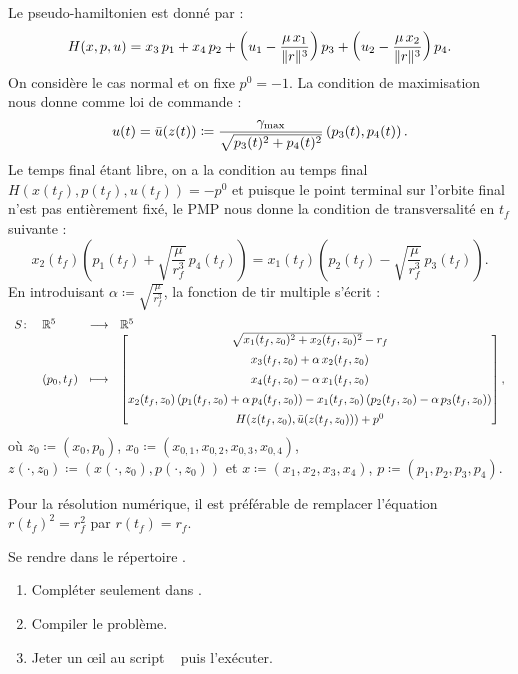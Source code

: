 Le pseudo-hamiltonien est donn\'e par : 
\[
    H(x,p,u) = x_3\, p_1 + x_4\, p_2 + \left(u_1 - \frac{\mu\, x_1}{\lVert r\rVert^3}\right) p_3 + \left(u_2 - \frac{\mu\, x_2}{\lVert r\rVert^3}\right) p_4.
\]
On consid\`ere le cas normal et on fixe $p^0=-1$.
La condition de maximisation nous donne comme loi de commande :
\[
    u(t) = \bar{u}(z(t)) \coloneqq \frac{\gamma_\mathrm{max}}{\sqrt{p_3(t)^2+p_4(t)^2}} \left( p_3(t) , p_4(t) \right).
\]
Le temps final \'etant libre, on a la condition au temps final $H(x(t_f), p(t_f), u(t_f)) = -p^0$ et
puisque le point terminal sur l'orbite final n'est pas enti\`erement fix\'e, le PMP nous donne la condition de transversalit\'e en $t_f$ 
suivante :
\[
    x_2(t_f) \left( p_1(t_f) + \sqrt{\frac{\mu}{r_f^3}}\, p_4(t_f) \right) = x_1(t_f) \left( p_2(t_f) - \sqrt{\frac{\mu}{r_f^3}}\, p_3(t_f) \right).
\]
En introduisant $\alpha \coloneqq \sqrt{\frac{\mu}{r_f^3}}$, la fonction de tir multiple s'\'ecrit :
\begin{equation*}
    \begin{array}{rlll}
        S \colon    & \mathbb{R}^5          & \longrightarrow   & \mathbb{R}^5 \\
        & (p_0, t_f)      & \longmapsto       &
        \begin{bmatrix}
            \sqrt{x_1(t_f, z_0)^2 + x_2(t_f, z_0)^2} - r_f \\[0.5em]
            x_3(t_f, z_0) + \alpha\, x_2(t_f, z_0) \\[0.5em]
            x_4(t_f, z_0) - \alpha\, x_1(t_f, z_0) \\[0.5em]
            x_2(t_f, z_0) \left( p_1(t_f, z_0) + \alpha\, p_4(t_f, z_0) \right) - x_1(t_f, z_0) \left( p_2(t_f, z_0) - \alpha\, p_3(t_f, z_0) \right) \\[0.5em]
            H(z(t_f, z_0), \bar{u}(z(t_f, z_0))) + p^0
        \end{bmatrix},
    \end{array}
\end{equation*}
o\`u $z_0 \coloneqq (x_0, p_0)$, $x_0 \coloneqq (x_{0,1}, x_{0,2}, x_{0,3}, x_{0,4})$, $z(\cdot, z_0) \coloneqq (x(\cdot, z_0), p(\cdot, z_0))$ et
$x \coloneqq (x_1, x_2, x_3, x_4)$, $p\coloneqq (p_1, p_2, p_3, p_4)$.

\begin{myremark}
    Pour la r\'esolution num\'erique, il est pr\'ef\'erable de remplacer l'\'equation $r(t_f)^2 = r_f^2$ par $r(t_f) = r_f$.
\end{myremark}

\begin{myExercice} Se rendre dans le r\'epertoire .
    \begin{enumerate}
        \item Compl\'eter seulement  dans .
        \item Compiler le probl\`eme.
        \item Jeter un \oe il au script \matlab\  puis l'ex\'ecuter.
    \end{enumerate}
\end{myExercice}



